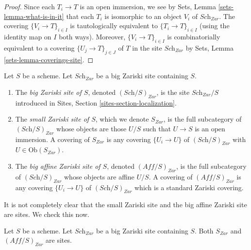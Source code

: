 \begin{proof}
Since each $T_i \to T$ is an open immersion, we see by
Sets, Lemma \ref{sets-lemma-what-is-in-it}
that each $T_i$ is isomorphic to an object $V_i$ of $\textit{Sch}_{Zar}$.
The covering $\{V_i \to T\}_{i \in I}$ is tautologically equivalent
to $\{T_i \to T\}_{i \in I}$ (using the identity map on $I$ both ways).
Moreover, $\{V_i \to T\}_{i \in I}$ is combinatorially equivalent to a
covering $\{U_j \to T\}_{j \in J}$ of $T$ in the site $\textit{Sch}_{Zar}$ by
Sets, Lemma \ref{sets-lemma-coverings-site}.
\end{proof}

\begin{definition}
\label{definition-big-small-Zariski}
Let $S$ be a scheme. Let $\textit{Sch}_{Zar}$ be a big Zariski
site containing $S$.
\begin{enumerate}
\item The {\it big Zariski site of $S$}, denoted
$(\textit{Sch}/S)_{Zar}$, is the site $\textit{Sch}_{Zar}/S$
introduced in Sites, Section \ref{sites-section-localization}.
\item The {\it small Zariski site of $S$}, which we denote
$S_{Zar}$, is the full subcategory of $(\textit{Sch}/S)_{Zar}$
whose objects are those $U/S$ such that $U \to S$ is an open immersion.
A covering of $S_{Zar}$ is any covering $\{U_i \to U\}$ of
$(\textit{Sch}/S)_{Zar}$ with $U \in \text{Ob}(S_{Zar})$.
\item The {\it big affine Zariski site of $S$}, denoted
$(\textit{Aff}/S)_{Zar}$, is the full subcategory of
$(\textit{Sch}/S)_{Zar}$ whose objects are affine $U/S$.
A covering of $(\textit{Aff}/S)_{Zar}$ is any covering
$\{U_i \to U\}$ of $(\textit{Sch}/S)_{Zar}$ which is a
standard Zariski covering.
\end{enumerate}
\end{definition}

\noindent
It is not completely clear that the small Zariski site and
the big affine Zariski site are sites. We check this now.

\begin{lemma}
\label{lemma-verify-site-Zariski}
Let $S$ be a scheme. Let $\textit{Sch}_{Zar}$ be a big Zariski
site containing $S$.
Both $S_{Zar}$ and $(\textit{Aff}/S)_{Zar}$ are sites.
\end{lemma}


